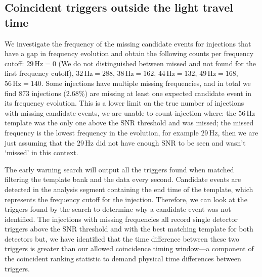 \subsection{\label{6:sec:light-travel-time}Coincident triggers outside the light travel time}

We investigate the frequency of the missing candidate events for injections that have a gap in frequency evolution and obtain the following counts per frequency cutoff: $29 \, \text{Hz} = 0$ (We do not distinguished between missed and not found for the first frequency cutoff), $32 \, \text{Hz} = 288$, $38 \, \text{Hz} = 162$, $44 \, \text{Hz} = 132$, $49 \, \text{Hz} = 168$, $56 \, \text{Hz} = 140$. Some injections have multiple missing frequencies, and in total we find $873$ injections ($2.68\%$) are missing at least one expected candidate event in its frequency evolution. This is a lower limit on the true number of injections with missing candidate events, we are unable to count injection where: the $56 \, \text{Hz}$ template was the only one above the SNR threshold and was missed; the missed frequency is the lowest frequency in the evolution, for example $29 \, \text{Hz}$, then we are just assuming that the $29 \, \text{Hz}$ did not have enough SNR to be seen and wasn't `missed' in this context.

The early warning search will output all the triggers found when matched filtering the template bank and the data every second. Candidate events are detected in the analysis segment containing the end time of the template, which represents the frequency cutoff for the injection. Therefore, we can look at the triggers found by the search to determine why a candidate event was not identified. The injections with missing frequencies all record single detector triggers above the SNR threshold and with the best matching template for both detectors but, we have identified that the time difference between these two triggers is greater than our allowed coincidence timing window---a component of the coincident ranking statistic to demand physical time differences between triggers.

